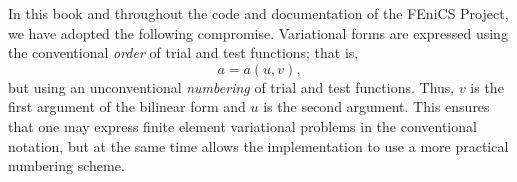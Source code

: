 In this book and throughout the code and documentation of the FEniCS
Project, we have adopted the following compromise. Variational forms
are expressed using the conventional \emph{order} of trial and test
functions; that is,
\begin{equation}
  a = a(u, v),
\end{equation}
but using an unconventional \emph{numbering} of trial and test
functions. Thus, $v$ is the first argument of the bilinear form and
$u$ is the second argument. This ensures that one may express finite
element variational problems in the conventional notation, but at the
same time allows the implementation to use a more practical numbering
scheme.
